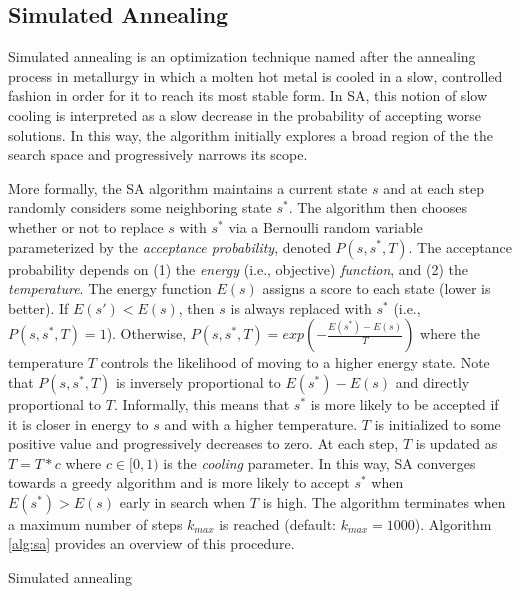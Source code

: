 \subsection{Simulated Annealing}\label{sec:sa}

Simulated annealing is an optimization technique named after the annealing process in metallurgy in which a molten hot metal is cooled in a slow, controlled fashion in order for it to reach its most stable form.
In SA, this notion of slow cooling is interpreted as a slow decrease in the probability of accepting worse solutions.
In this way, the algorithm initially explores a broad region of the the search space and progressively narrows its scope.

More formally, the SA algorithm maintains a current state $s$ and at each step randomly considers some neighboring state $s^*$.
The algorithm then chooses whether or not to replace $s$ with $s^*$ via a Bernoulli random variable parameterized by the \emph{acceptance probability}, denoted $P(s, s^*, T)$. %
The acceptance probability depends on (1) the \emph{energy} (i.e., objective) \emph{function}, and (2) the \emph{temperature}.
The energy function $E(s)$ assigns a score to each state (lower is better).
If $E(s') < E(s)$, then $s$ is always replaced with $s^*$ (i.e., $P(s, s^*, T) = 1$).
Otherwise, $P(s, s^*, T) = exp(-\frac{E(s^*) - E(s)}{T})$ where the temperature $T$ controls the likelihood of moving to a higher energy state.
Note that $P(s, s^*, T)$ is inversely proportional to $E(s^*) - E(s)$ and directly proportional to $T$.
Informally, this means that $s^*$ is more likely to be accepted if it is closer in energy to $s$ and with a higher temperature.
$T$ is initialized to some positive value and progressively decreases to zero.
At each step, $T$ is updated as $T = T * c$ where $c \in [0, 1)$ is the \emph{cooling} parameter. %
In this way, SA converges towards a greedy algorithm and is more likely to accept $s^*$ when $E(s^*) > E(s)$ early in search when $T$ is high.
The algorithm terminates when a maximum number of steps $k_{max}$ is reached (default: $k_{max} = 1000$).
Algorithm \ref{alg:sa} provides an overview of this procedure.

\begin{algorithm}[t]
  \caption{Simulated annealing
    \label{alg:sa}}
  \begin{algorithmic}[1]
        \EndIf
      \EndFor
      \State {}
    \EndFunction
  \end{algorithmic}
\end{algorithm}

